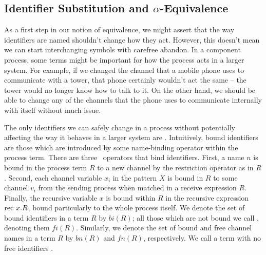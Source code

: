 \subsection{Identifier Substitution and $\alpha$-Equivalence}\label{secSubst}
	As a first step in our notion of equivalence, we might assert that the way identifiers are named shouldn't change how they act.  
However, this doesn't mean we can start interchanging symbols with carefree abandon.  
In a component process, some terms might be important for how the process acts in a larger system.  
For example, if we changed the channel that a mobile phone uses to communicate with a tower, that phone certainly wouldn't act the same -- the tower would no longer know how to talk to it.  
On the other hand, we should be able to change any of the channels that the phone uses to communicate internally with itself without much issue.
	
	The only identifiers we can safely change in a process without potentially affecting the way it behaves in a larger system are .\!\!\!\!
Intuitively, bound identifiers are those which are introduced by some name-binding operator within the process term.
There are three \picalc\ operators that bind identifiers.
First, a name $n$ is bound in the process term $R$ to a new channel by the restriction operator as in $R$.  
Second, each channel variable $x_i$ in the pattern $X$ is bound in $R$ to some channel $v_i$ from the sending process when matched in a receive expression $R$.  
Finally, the recursive variable $x$ is bound within $R$ in the recursive expression $\text{rec }{x}.R$, bound particularly to the whole process itself.
	We denote the set of bound identifiers in a term $R$ by $bi(R)$; all those which are not bound we call , denoting them $fi(R)$.  
Similarly, we denote the set of bound and free channel names in a term $R$ by $bn(R)$ and $fn(R)$, respectively.  
We call a term with no free identifiers .
	
